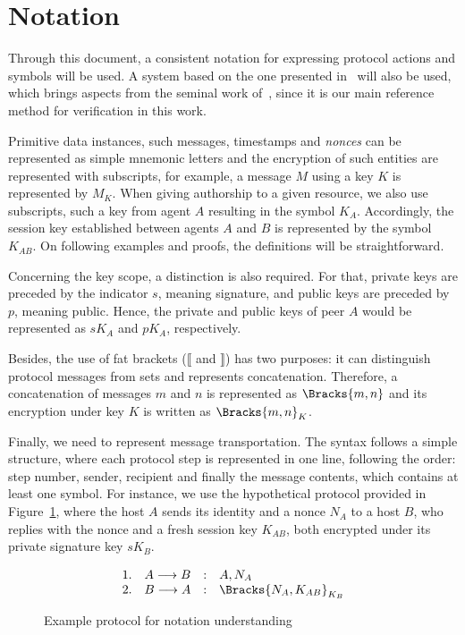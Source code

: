 \section{Notation}
Through this document, a consistent notation for expressing protocol actions and symbols will be used. A system based on the one presented in~\cite{Bella2007} will also be used, which brings aspects from the seminal work of~\cite{Burrows90}, since it is our main reference method for verification in this work.

Primitive data instances, such messages, timestamps and \textit{nonces} can be represented as simple mnemonic letters and the encryption of such entities are represented with subscripts, for example, a message \(M\) using a key \(K\) is represented by \(M_K\). When giving authorship to a given resource, we also use subscripts, such a key from agent \(A\) resulting in the symbol \(K_A\). Accordingly, the session key established between agents \(A\) and \(B\) is represented by the symbol \(K_{AB}\). On following examples and proofs, the definitions will be straightforward.

Concerning the key scope, a distinction is also required. For that, private keys are preceded by the indicator \(s\), meaning signature, and public keys are preceded by \(p\), meaning public. Hence, the private and public keys of peer \(A\) would be represented as \(sK_A\) and \(pK_A\), respectively.

Besides, the use of fat brackets (\(\lBrack \) and \(\rBrack \)) has two purposes: it can distinguish protocol messages from sets and represents concatenation. Therefore, a concatenation of messages \(m\) and \(n\) is represented as \(\Bracks{m,n}\) and its encryption under key \(K\) is written as \(\Bracks{m,n}_K\).

Finally, we need to represent message transportation. The syntax follows a simple structure, where each protocol step is represented in one line, following the order: step number, sender, recipient and finally the message contents, which contains at least one symbol. For instance, we use the hypothetical protocol provided in Figure~\ref{prt:notation-example}, where the host \(A\) sends its identity and a nonce \(N_A\) to a host \(B\), who replies with the nonce and a fresh session key \(K_{AB}\), both encrypted under its private signature key \(sK_B\).

\begin{figure}[ht]\label{prt:notation-example}
  \centering
    \[
    \begin{array}{rlcl}
      1. & A \longrightarrow B &:& A, N_A \\
      2. & B \longrightarrow A &:& \Bracks{N_A, K_{AB}}_{K_B} \\
    \end{array}
    \]
  \caption{Example protocol for notation understanding}
\end{figure}

